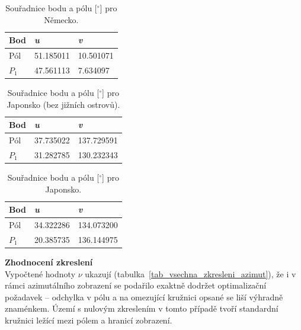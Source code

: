     \begin{table}[h!]
        \centering
        \begin{tabular}{|p{3cm}|p{3cm}|p{3cm}|} 
         \hline
            Bod & \textit{u}  & \textit{v} \\
            \hline
            Pól  &   51.185011 & 10.501071 \\
            \hline
            $P_1$   &  47.561113 &  7.634097\\
            \hline

        \end{tabular}
        \caption{Souřadnice bodu a pólu [$^\circ$] pro Německo.}
\label{table:7}
    \end{table}


    \begin{table}[h!]
        \centering
        \begin{tabular}{|p{3cm}|p{3cm}|p{3cm}|} 
         \hline
            Bod & \textit{u}  & \textit{v} \\
            \hline
            Pól  &   37.735022  & 137.729591 \\
            \hline
            $P_1$   &  31.282785 &  130.232343 \\
            \hline

         
        \end{tabular}
        \caption{Souřadnice bodu a pólu [$^\circ$] pro Japonsko (bez jižních ostrovů).}
\label{table:8}
    \end{table}



    \begin{table}[h!]
        \centering
        \begin{tabular}{|p{3cm}|p{3cm}|p{3cm}|} 
         \hline
            Bod & \textit{u}  & \textit{v} \\
            \hline
            Pól  &   34.322286  & 134.073200 \\
            \hline
            $P_1$   &  20.385735 &  136.144975 \\
            \hline

    
        \end{tabular}
        \caption{Souřadnice bodu a pólu [$^\circ$] pro Japonsko.}
\label{table:9}
    \end{table}

\textbf{Zhodnocení zkreslení} \\
Vypočtené hodnoty $\nu$  ukazují (tabulka~\ref{tab_vsechna_zkresleni_azimut}), že i v rámci azimutálního zobrazení se podařilo exaktně dodržet optimalizační požadavek – odchylka v pólu a na omezující kružnici opsané se liší výhradně znaménkem. Území s nulovým zkreslením v tomto případě tvoří standardní kružnici ležící mezi pólem a hranicí zobrazení.

